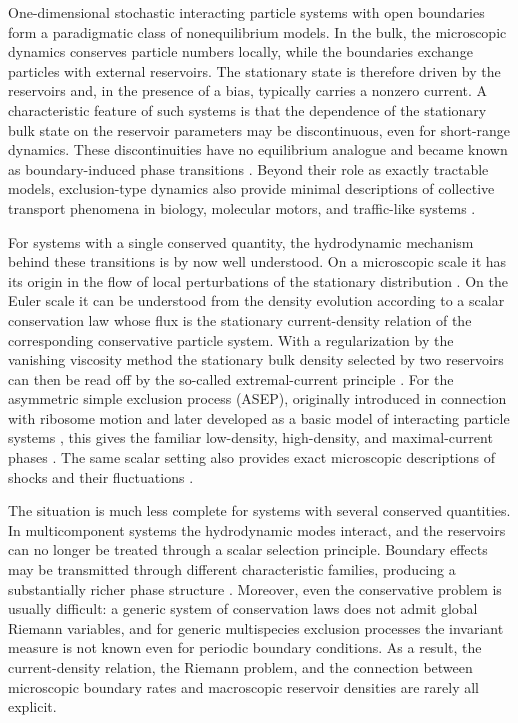 \documentclass[12pt]{article}
\begin{document}
One-dimensional stochastic interacting particle systems with open
boundaries form a paradigmatic class of nonequilibrium models. In the
bulk, the microscopic dynamics conserves particle numbers locally, while
the boundaries exchange particles with external reservoirs. The stationary
state is therefore driven by the reservoirs and, in the presence of a bias,
typically carries a nonzero current. A characteristic feature of such
systems is that the dependence of the stationary bulk state on the
reservoir parameters may be discontinuous, even for short-range dynamics.
These discontinuities have no equilibrium analogue and became known as
boundary-induced phase transitions \cite{Krug91}.
Beyond their role as exactly tractable models, exclusion-type dynamics
also provide minimal descriptions of collective transport phenomena in
biology, molecular motors, and traffic-like systems \cite{Chow24}.

For systems with a single conserved quantity, the hydrodynamic mechanism
behind these transitions is by now well understood. On a microscopic scale
it has its origin in the flow of local perturbations of the stationary distribution
\cite{Popk99,Hage01}. On the Euler scale it can be understood from the
density evolution according to a scalar conservation law whose flux is the
stationary current-density relation of the corresponding conservative
particle system. With a regularization by the vanishing viscosity method
\cite{Chen95} the stationary bulk density selected by two reservoirs can then be
read off by the so-called
extremal-current principle \cite{Popk99}. For the asymmetric simple
exclusion process (ASEP), originally introduced in connection with
ribosome motion \cite{MacD68} and later developed as a basic model of interacting
particle systems \cite{Spit70}, this gives the familiar
low-density, high-density, and maximal-current phases
\cite{Derr93a,Schu93b,Sand94b}. The same scalar setting also provides
exact microscopic descriptions of shocks and their fluctuations
\cite{Derr93b,Ferr94a,Schu23a}.

The situation is much less complete for systems with several conserved
quantities. In multicomponent systems the hydrodynamic modes interact, and
the reservoirs can no longer be treated through a scalar selection
principle. Boundary effects may be transmitted through different
characteristic families, producing a substantially richer phase structure
\cite{Popk04a,Popk11}. Moreover, even the conservative problem is usually
difficult: a generic system of conservation laws does not admit global
Riemann variables, and for generic multispecies exclusion processes the
invariant measure is not known even for periodic boundary conditions.
As a result, the current-density relation, the
Riemann problem, and the connection between microscopic boundary rates and
macroscopic reservoir densities are rarely all explicit.
\end{document}
